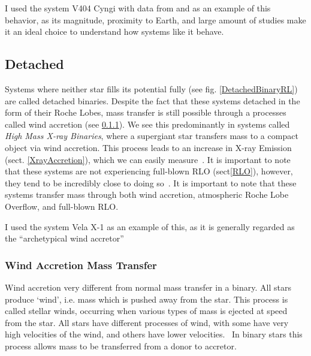 \documentclass[12pt, letterpaper]{article}
\begin{document}
        I used the system V404 Cyngi with data from \cite{Bernardini_2016} and \cite{Shahbaz_1994} as an example of this behavior, as its magnitude, proximity to Earth, and large amount of studies make it an ideal choice to understand how systems like it behave. 

        \subsection{\centering Detached}\label{DetachedBinary}

        Systems where neither star fills its potential fully (see fig. \ref{DetachedBinaryRL}) are called detached binaries. Despite the fact that these systems detached in the form of their Roche Lobes, mass transfer is still possible through a processes called wind accretion (see \ref{WindAccretion}). We see this predominantly in systems called \textit{High Mass X-ray Binaries}, where a supergiant star transfers mass to a compact object via wind accretion. This process leads to an increase in X-ray Emission (sect. \ref{XrayAccretion}), which we can easily measure~\cite{TaurisvandenHeuvel+2023}. It is important to note that these systems are not experiencing full-blown RLO (sect\ref{RLO}), however, they tend to be incredibly close to doing so~\cite{TaurisvandenHeuvel+2023}. It is important to note that these systems transfer mass through both wind accretion, atmospheric Roche Lobe Overflow, and full-blown RLO.

        I used the system Vela X-1 \cite{Kretschmar_2021} as an example of this, as it is generally regarded as the ``archetypical wind accretor''~\cite{Kretschmar_2021} 

        \subsubsection{Wind Accretion Mass Transfer} \label{WindAccretion}
        Wind accretion very different from normal mass transfer in a binary. All stars produce `wind', i.e. mass which is pushed away from the star. This process is called stellar winds, occurring when various types of mass is ejected at speed from the star. All stars have different processes of wind, with some have very high velocities of the wind, and others have lower velocities.~\cite{Lamers_1999} In binary stars this process allows mass to be transferred from a donor to accretor.
        
\end{document}
